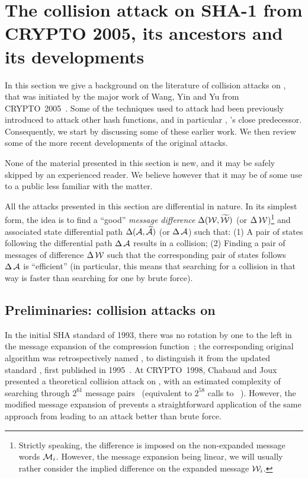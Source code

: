 \section{The collision attack on SHA-1 from CRYPTO 2005, its ancestors and its developments}
\label{sec:history}

In this section we give a background on the literature of collision attacks on \shaone, that was initiated by the major work of Wang, Yin and Yu from CRYPTO~2005~\cite{DBLP:conf/crypto/WangYY05a}.
Some of the techniques used to attack \shaone had been previously introduced to attack other hash functions, and in particular \shazero, \shaone's close predecessor. Consequently, we start by
discussing some of these earlier work. We then review some of the more recent developments of the original attacks.

None of the material presented in this section is new, and it may be safely skipped by an experienced reader. We believe however that it may be of some use to a public less familiar with
the matter.

\medskip

All the attacks presented in this section are differential in nature. In its simplest form, the idea is to find a ``good'' \emph{message difference} $\operatorname{\Delta}(\mathcal{W},\mathcal{\widetilde W})$
(or $\operatorname{\Delta}\mathcal{W}$)\footnote{Strictly speaking, the difference is imposed on the non-expanded message words $\mathcal{M}_i$. However, the message expansion being linear,
we will usually rather consider the implied difference on the expanded message $\mathcal{W}_i$.}
and associated state differential path $\operatorname{\Delta}(\mathcal{A},\mathcal{\widetilde A})$ (or $\operatorname{\Delta}\mathcal{A}$) such that: (1) A pair of states following the differential path
$\operatorname{\Delta}\mathcal{A}$ results in a collision; (2) Finding a pair of messages of difference $\operatorname{\Delta}\mathcal{W}$ such that the corresponding pair of states follows $\operatorname{\Delta}\mathcal{A}$ is
``efficient'' (in particular, this means that searching for a collision in that way is faster than searching for one by brute force).


\subsection{Preliminaries: collision attacks on \shazero}

In the initial SHA standard of 1993, there was no rotation by one to the left in the message expansion of the compression function~\cite{Nist-SHA0}; the corresponding original algorithm was
retrospectively named \shazero, to distinguish it from the updated standard \shaone, first published in 1995~\cite{Nist-SHA1}.
At CRYPTO~1998, Chabaud and Joux presented a theoretical collision attack on \shazero, with an estimated complexity of searching through $2^{61}$ message pairs~\cite{DBLP:conf/crypto/ChabaudJ98}
(equivalent to $2^{58}$ calls to \shazero~\cite{DBLP:journals/joc/BihamCJ15}). However, the modified message
expansion of \shaone prevents a straightforward application of the same approach from leading to an attack better than brute force.

